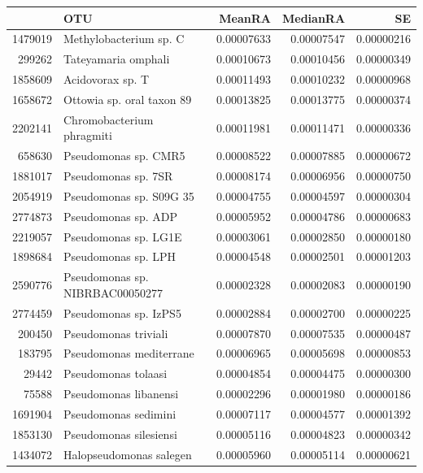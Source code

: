 \documentclass{article}
\begin{document}
\begin{table}[ht]
\centering
\begin{tabular}{rlrrr}
  \hline
 & OTU & MeanRA & MedianRA & SE \\ 
  \hline
1479019 & Methylobacterium sp. C & 0.00007633 & 0.00007547 & 0.00000216 \\ 
  299262 & Tateyamaria omphali & 0.00010673 & 0.00010456 & 0.00000349 \\ 
  1858609 & Acidovorax sp. T & 0.00011493 & 0.00010232 & 0.00000968 \\ 
  1658672 & Ottowia sp. oral taxon 89 & 0.00013825 & 0.00013775 & 0.00000374 \\ 
  2202141 & Chromobacterium phragmiti & 0.00011981 & 0.00011471 & 0.00000336 \\ 
  658630 & Pseudomonas sp. CMR5 & 0.00008522 & 0.00007885 & 0.00000672 \\ 
  1881017 & Pseudomonas sp. 7SR & 0.00008174 & 0.00006956 & 0.00000750 \\ 
  2054919 & Pseudomonas sp. S09G 35 & 0.00004755 & 0.00004597 & 0.00000304 \\ 
  2774873 & Pseudomonas sp. ADP & 0.00005952 & 0.00004786 & 0.00000683 \\ 
  2219057 & Pseudomonas sp. LG1E & 0.00003061 & 0.00002850 & 0.00000180 \\ 
  1898684 & Pseudomonas sp. LPH & 0.00004548 & 0.00002501 & 0.00001203 \\ 
  2590776 & Pseudomonas sp. NIBRBAC00050277 & 0.00002328 & 0.00002083 & 0.00000190 \\ 
  2774459 & Pseudomonas sp. IzPS5 & 0.00002884 & 0.00002700 & 0.00000225 \\ 
  200450 & Pseudomonas triviali & 0.00007870 & 0.00007535 & 0.00000487 \\ 
  183795 & Pseudomonas mediterrane & 0.00006965 & 0.00005698 & 0.00000853 \\ 
  29442 & Pseudomonas tolaasi & 0.00004854 & 0.00004475 & 0.00000300 \\ 
  75588 & Pseudomonas libanensi & 0.00002296 & 0.00001980 & 0.00000186 \\ 
  1691904 & Pseudomonas sedimini & 0.00007117 & 0.00004577 & 0.00001392 \\ 
  1853130 & Pseudomonas silesiensi & 0.00005116 & 0.00004823 & 0.00000342 \\ 
  1434072 & Halopseudomonas salegen & 0.00005960 & 0.00005114 & 0.00000621 \\ 

\end{tabular}
\end{table}
\end{document}

